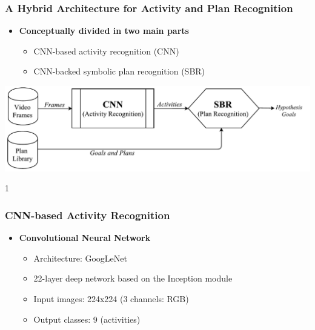 \documentclass{beamer}
\def\masterclass{1}
\begin{document}
\begin{frame}[c]\frametitle{A Hybrid Architecture for Activity and Plan Recognition}
   	\begin{itemize}
   		\item \textbf{Conceptually divided in two main parts}
   		\begin{itemize}
				\item CNN-based activity recognition (CNN)
                \item CNN-backed symbolic plan recognition (SBR)
	    \end{itemize}
	\end{itemize}
	\begin{center}
		\includegraphics[width=0.8\linewidth]{fig/pipeline.pdf}
	\end{center}
\end{frame}

\if\masterclass1
\begin{frame}[c]\frametitle{CNN-based Activity Recognition}
   	\begin{itemize}
   		\item \textbf{Convolutional Neural Network}
   		\begin{itemize}
   		    \item Architecture: GoogLeNet
			\item 22-layer deep network based on the Inception module
            \item Input images: 224x224 (3 channels: RGB)
            \item Output classes: 9 (activities)
	    \end{itemize}
		
	\end{itemize}
\end{frame}
\end{document}
